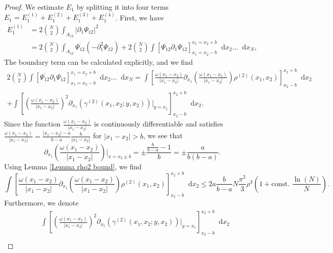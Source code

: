 \documentclass[a4paper,11pt]{article}
\newcommand{\abs}[1]{\left\lvert #1 \right\rvert}
\newcommand*\diff{\mathop{}\!\mathrm{d}}
\numberwithin{equation}{section}
\begin{document}
		\begin{proof}
		We estimate $ E_1 $ by splitting it into four terms $ E_1=E_1^{(1)}+E_1^{(2)}+E_1^{(3)}+E_1^{(4)} $. First, we have \begin{equation}
		\begin{aligned}
		E_1^{(1)}&=2\binom{N}{2}\int_{A_{12}}\abs{\partial_1\Psi_{12}}^2\\&
		=2\binom{N}{2}\int_{A_{12}}\overline{\Psi_{12}}\left( -\partial^2_1 \Psi_{12} \right)+2\binom{N}{2}\int\left[\overline{\Psi_{12}}\partial_1\Psi_{12}\right]_{x_1=x_2-b}^{x_1=x_2+b}\diff x_2\dots\diff x_N,
		\end{aligned}
		\end{equation}
		The boundary term can be calculated explicitly, and we find \begin{equation}
		\begin{aligned}
		2\binom{N}{2}\int\left[\overline{\Psi_{12}}\partial_1\Psi_{12}\right]_{x_1=x_2-b}^{x_1=x_2+b}\diff x_2\dots\diff x_N=\int\left[\frac{\omega(x_1-x_2)}{\abs{x_1-x_2}}\partial_{x_1}\left(\frac{\omega(x_1-x_2)}{\abs{x_1-x_2}}\right)\rho^{(2)}(x_1,x_2)\right]_{x_2-b}^{x_2+b}\diff x_2\\+\int\left[\left(\frac{\omega(x_1-x_2)}{\abs{x_1-x_2}}\right)^2\partial_{x_1}\left(\gamma^{(2)}(x_1,x_2;y,x_2)\right)\bigg\vert_{y=x_1}\right]_{x_2-b}^{x_2+b}\diff x_2.
		\end{aligned}
		\end{equation}
		Since the function $ \frac{\omega(x_1-x_2)}{\abs{x_1-x_2}} $ is continuously differentiable and satisfies $ \frac{\omega(x_1-x_2)}{\abs{x_1-x_2}}=\frac{\abs{x_1-x_2}-a}{b-a}\frac{b}{\abs{x_1-x_2}} $ for $ \abs{x_1-x_2}>b $, we see that \begin{equation}
		\partial_{x_1}\left(\frac{\omega(x_1-x_2)}{\abs{x_1-x_2}}\right)\bigg\vert_{x=x_2\pm b}=\pm \frac{\frac{b}{b-a}-1}{ b}=\pm\frac{a}{b(b-a)}.
		\end{equation}
		Using Lemma \ref{Lemma rho2 bound}, we find \begin{equation}
		\int\left[\frac{\omega(x_1-x_2)}{\abs{x_1-x_2}}\partial_{x_1}\left(\frac{\omega(x_1-x_2)}{\abs{x_1-x_2}}\right)\rho^{(2)}(x_1,x_2)\right]_{x_2-b}^{x_2+b}\diff x_2\leq 2a\frac{b}{b-a} N\frac{\pi^2}{3}\rho^3\left(1+\text{const. }\frac{\ln(N)}{N}\right).
		\end{equation}
		Furthermore, we denote \begin{equation}\label{EqGammaDeriv2.}
		\begin{aligned}
		&\int\left[\left(\frac{\omega(x_1-x_2)}{\abs{x_1-x_2}}\right)^2\partial_{x_1}\left(\gamma^{(2)}(x_1,x_2;y,x_2)\right)\bigg\vert_{y=x_1}\right]_{x_2-b}^{x_2+b}\diff x_2\\

\end{aligned}
\end{equation}
\end{proof}
\end{document}
